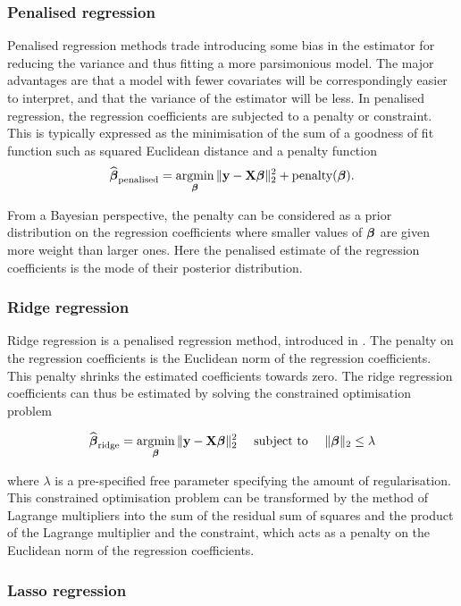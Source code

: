 \subsubsection{Penalised regression}

Penalised regression methods trade introducing some bias in the estimator for
reducing the variance and thus fitting a more parsimonious model. The major
advantages are that a model with fewer covariates will be correspondingly easier
to interpret, and that the variance of the estimator will be less. In penalised
regression, the regression coefficients are subjected to a penalty or
constraint. This is typically expressed as the minimisation of the sum of a
goodness of fit function such as squared Euclidean distance and a penalty
function
$$
\widehat{\vbeta}_{\text{penalised}} = \argmin_\vbeta \|\vy - \mX \vbeta\|_2^2 + \text{penalty}(\vbeta).
$$

From a Bayesian perspective, the penalty can be considered as a prior
distribution on the regression coefficients where smaller values of ${\boldsymbol \beta}$ are
given more weight than larger ones. Here the penalised estimate of the
regression coefficients is the mode of their posterior distribution.

\subsubsection{Ridge regression}

Ridge regression is a penalised regression method, introduced in
\cite{Hoerl1970}. The penalty on the regression coefficients is the Euclidean
norm of the regression coefficients. This penalty shrinks the estimated
coefficients towards zero. The ridge regression coefficients can thus be
estimated by solving the constrained optimisation problem

$$
\widehat{\vbeta}_{\text{ridge}} = \argmin_\vbeta \|\vy - \mX \vbeta\|_2^2 \quad \text{ subject to } \quad \|\vbeta\|_2 \leq \lambda
$$

\noindent 
where $\lambda$ is a pre-specified free parameter specifying the amount of
regularisation. This constrained optimisation problem can be transformed by the
method of Lagrange multipliers into the sum of the residual sum of squares and
the product of the Lagrange multiplier and the constraint, which acts as a
penalty on the Euclidean norm of the regression coefficients.


\subsubsection{Lasso regression}

